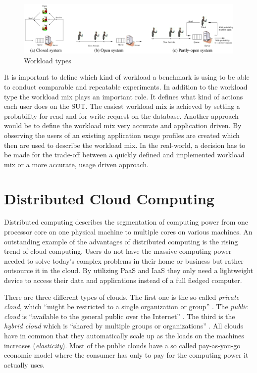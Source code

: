 \begin{figure}[h]
  \centering
  \includegraphics[width=\textwidth]{Figures/workload_types.png}
  \caption[Workload types]{Workload types \cite[2]{Schroeder.2006}}
  \label{fig:workload-types}
\end{figure}

It is important to define which kind of workload a benchmark is using to be able to conduct comparable and repeatable experiments. In addition to the workload type the workload mix plays an important role. It defines what kind of actions each user does on the \ac{SUT}. The easiest workload mix is achieved by setting a probability for read and for write request on the database. Another approach would be to define the workload mix very accurate and application driven. By observing the users of an existing application usage profiles are created which then are used to describe the workload mix. In the real-world, a decision has to be made for the trade-off between a quickly defined and implemented workload mix or a more accurate, usage driven approach.

\section{Distributed Cloud Computing}
\label{sec:distributed-computing}
Distributed computing describes the segmentation of computing power from one processor core on one physical machine to multiple cores on various machines. An outstanding example of the advantages of distributed computing is the rising trend of cloud computing. Users do not have the massive computing power needed to solve today's complex problems in their home or business but rather outsource it in the cloud. By utilizing \acf{PaaS} and \acf{IaaS} they only need a lightweight device to access their data and applications instead of a full fledged computer. \cite[1 - 2]{dikaiakos.2009}

There are three different types of clouds. The first one is the so called \emph{private cloud}, which \enquote{might be restricted to a single organization or group} \cite[2]{dikaiakos.2009}. The \emph{public cloud} is \enquote{available to the general public over the Internet} \cite[2]{dikaiakos.2009}. The third is the \emph{hybrid cloud} which is \enquote{shared by multiple groups or organizations} \cite[2]{dikaiakos.2009}. All clouds have in common that they automatically scale up as the loads on the machines increases (\emph{elasticity}). Most of the public clouds have a so called pay-as-you-go economic model where the consumer has only to pay for the computing power it actually uses. \cite[2]{dikaiakos.2009}



